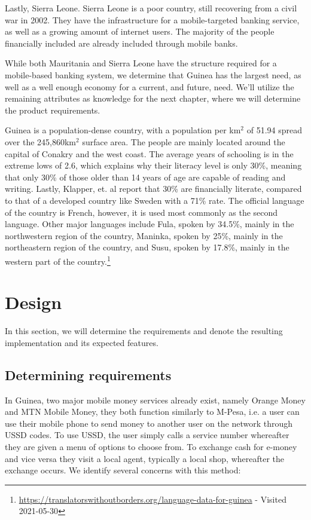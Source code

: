 \documentclass[11pt, a4paper]{article}
\begin{document}
Lastly, Sierra Leone. Sierra Leone is a poor country, still recovering from a civil war in 2002. They have the infrastructure for a mobile-targeted banking service, as well as a growing amount of internet users. The majority of the people financially included are already included through mobile banks.

While both Mauritania and Sierra Leone have the structure required for a mobile-based banking system, we determine that Guinea has the largest need, as well as a well enough economy for a current, and future, need. We'll utilize the remaining attributes as knowledge for the next chapter, where we will determine the product requirements.

Guinea is a population-dense country, with a population per km$^2$ of 51.94\cite{wbdata} spread over the 245,860km$^2$ surface area. The people are mainly located around the capital of Conakry and the west coast. The average years of schooling is in the extreme lows of 2.6\cite{owidliteracy}, which explains why their literacy level is only 30\%, meaning that only 30\% of those older than 14 years of age are capable of reading and writing\cite{owidliteracy}. Lastly, Klapper, et. al\cite{Klfin} report that 30\% are financially literate, compared to that of a developed country like Sweden with a 71\% rate. The official language of the country is French, however, it is used most commonly as the second language. Other major languages include Fula, spoken by 34.5\%, mainly in the northwestern region of the country, Maninka, spoken by 25\%, mainly in the northeastern region of the country, and Susu, spoken by 17.8\%, mainly in the western part of the country.\footnote{\label{lang} \url{https://translatorswithoutborders.org/language-data-for-guinea} - Visited 2021-05-30}



\section{Design}
In this section, we will determine the requirements and denote the resulting implementation and its expected features.

\subsection{Determining requirements}
In Guinea, two major mobile money services already exist, namely Orange Money and MTN Mobile Money, they both function similarly to M-Pesa, i.e. a user can use their mobile phone to send money to another user on the network through USSD codes. To use USSD, the user simply calls a service number whereafter they are given a menu of options to choose from. To exchange cash for e-money and vice versa they visit a local agent, typically a local shop, whereafter the exchange occurs. We identify several concerns with this method:
\end{document}
